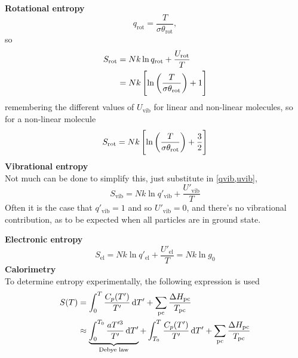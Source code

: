\textbf{Rotational entropy}\\
\begin{equation}
	q_{\text{rot}}=\frac{T}{\sigma\theta_{\text{rot}}},
\end{equation}
so 
\begin{equation}
\begin{aligned}
	S_{\text{rot}}&=Nk\ln q_{\text{rot}}+\frac{U_{\text{rot}}}{T}\\
	&=Nk\left[\ln\left(\frac{T}{\sigma\theta_{\text{rot}}} \right)+1 \right]
\end{aligned}
\end{equation}
remembering the different values of $U_{\text{vib}}$ for linear and non-linear molecules, so for a non-linear molecule
\begin{equation}
	S_{\text{rot}}=Nk\left[\ln\left(\frac{T}{\sigma\theta_{\text{rot}}} \right)+\frac{3}{2} \right]
\end{equation}
\textbf{Vibrational entropy}\\
Not much can be done to simplify this, just substitute in \cref{qvib,uvib},
\begin{equation}
	S_{\text{vib}}=Nk\ln q'_{\text{vib}}+\frac{U'_{\text{vib}}}{T}
\end{equation}
Often it is the case that $q'_{\text{vib}}=1$ and so $U'_{\text{vib}}=0$, and there's no vibrational contribution, as to be expected when all particles are in ground state.\par
\textbf{Electronic entropy}
\begin{equation}
	S_{\text{el}}=Nk\ln q'_{\text{el}}+\frac{U'_{\text{el}}}{T}=Nk\ln g_0
\end{equation}
\textbf{Calorimetry}\\
To determine entropy experimentally, the following expression is used
\begin{equation}
\begin{aligned}
	S(T)&=\int_0^T\frac{C_p(T')}{T'}\dif T'+\sum_{\text{pc}}\frac{\Delta H_{\text{pc}}}{T_{\text{pc}}}\\
	&\approx\underbrace{\int_0^{T_0}\frac{aT'^3}{T'}\dif T'}_{\text{Debye law}}+\int_{T_0}^T\frac{C_p(T')}{T'}\dif T'+\sum_{\text{pc}}\frac{\Delta H_{\text{pc}}}{T_{\text{pc}}}
\end{aligned}
\end{equation}




